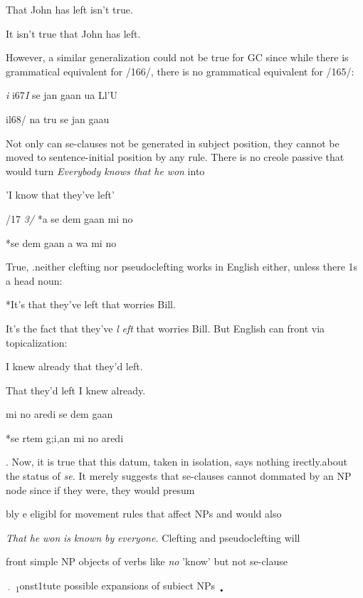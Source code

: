 \ea\label{ex:165}
 That John has left isn't true.
\glt
\z

\ea\label{ex:166}
 It isn't true that John has left.
\glt
\z

However, a similar generalization could not be true for GC since while there is grammatical equivalent for /166/, there is no grammatical equivalent for /165/:

\textit{i} i67\textit{I} se jan gaan ua Ll'U

il68/ na tru se jan gaau

Not only can se-clauses not be generated in subject position, they cannot be moved to sentence-initial position by any rule. There is no creole passive that would turn \textit{Everybo}\textit{d}\textit{y knows that he} \textit{won }into

'I know that they've left'

/17 \textit{3/} *a se dem gaan mi no

\ea\label{ex:174}
 *se dem gaan a wa mi no
\glt
\z

True, .neither clefting nor pseudoclefting works in English either, unless there 1s a head noun:

\ea\label{ex:175}
 *It's that they've left that worries Bill.
\glt
\z

\ea\label{ex:176}
 It's the fact that they've \textit{l} \textit{eft} that worries Bill. But English can front via topicalization:
\glt
\z

\ea\label{ex:177}
 I knew already that they'd left.
\glt
\z

\ea\label{ex:178}
 That they'd left I knew already.
\glt
\z

\ea\label{ex:179}
 mi no aredi se dem gaan
\glt
\z

\ea\label{ex:180}
 *se rtem g;i,an mi no aredi
\glt
\z

. Now, it is true that this datum, taken in isolation, says nothing irectly.about the status of \textit{se.} It merely suggests that se-clauses cannot dommated by an NP node since if they were, they would presum\-

bly e eligibl for movement rules that affect NPs and would also

\textit{That} \textit{he} \textit{won} \textit{is} \textit{k}\textit{nown} \textit{by} \textit{everyone.} Clefting and pseudoclefting will

front simple NP objects of verbs like \textit{no }'know' but not se-clause 

\textsubscript{·}\textsubscript{ }\textsubscript{1}onst1tute possible expansions of subiect NPs \textsubscript{•}

